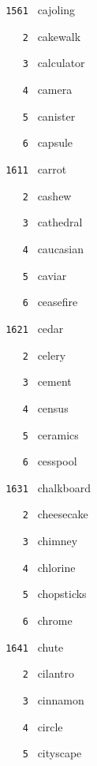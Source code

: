 \documentclass[11pt]{article}
\begin{document}
\begin{multicols}{6}
\vspace{3mm}
\noindent \texttt{ 1561 } cajoling  \par
\noindent \texttt{ \ \ \ 2 } cakewalk  \par
\noindent \texttt{ \ \ \ 3 } calculator  \par
\noindent \texttt{ \ \ \ 4 } camera  \par
\noindent \texttt{ \ \ \ 5 } canister  \par
\noindent \texttt{ \ \ \ 6 } capsule  \par
\noindent \texttt{ 1611 } carrot  \par
\noindent \texttt{ \ \ \ 2 } cashew  \par
\noindent \texttt{ \ \ \ 3 } cathedral  \par
\noindent \texttt{ \ \ \ 4 } caucasian  \par
\noindent \texttt{ \ \ \ 5 } caviar  \par
\noindent \texttt{ \ \ \ 6 } ceasefire  \par
\vspace{3mm}
\noindent \texttt{ 1621 } cedar  \par
\noindent \texttt{ \ \ \ 2 } celery  \par
\noindent \texttt{ \ \ \ 3 } cement  \par
\noindent \texttt{ \ \ \ 4 } census  \par
\noindent \texttt{ \ \ \ 5 } ceramics  \par
\noindent \texttt{ \ \ \ 6 } cesspool  \par
\vspace{3mm}
\noindent \texttt{ 1631 } chalkboard  \par
\noindent \texttt{ \ \ \ 2 } cheesecake  \par
\noindent \texttt{ \ \ \ 3 } chimney  \par
\noindent \texttt{ \ \ \ 4 } chlorine  \par
\noindent \texttt{ \ \ \ 5 } chopsticks  \par
\noindent \texttt{ \ \ \ 6 } chrome  \par
\vspace{3mm}
\noindent \texttt{ 1641 } chute  \par
\noindent \texttt{ \ \ \ 2 } cilantro  \par
\noindent \texttt{ \ \ \ 3 } cinnamon  \par
\noindent \texttt{ \ \ \ 4 } circle  \par
\noindent \texttt{ \ \ \ 5 } cityscape  \par

\end{multicols}
\end{document}
